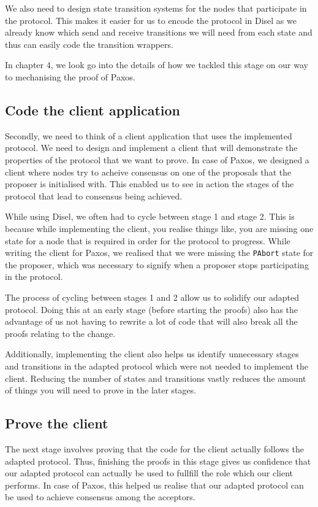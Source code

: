 We also need to design state transition systems for the nodes that participate
in the protocol. This makes it easier for us to encode the protocol in Disel as
we already know which send and receive transitions we will need from each state
and thus can easily code the transition wrappers.

In chapter 4, we look go into the details of how we tackled this stage on our way
to mechanising the proof of Paxos.

\subsection{Code the client application}
Secondly, we need to think of a client application that uses the implemented protocol.
We need to design and implement a client that will demonstrate the properties of the
protocol that we want to prove. In case of Paxos, we designed a client
where nodes try to acheive consensus on one of the proposals that the proposer
is initialised with. This enabled us to see in action the stages of the protocol
that lead to consensus being achieved.

While using Disel, we often had to cycle between stage 1 and stage 2.
This is because while implementing the client, you realise things like, you are
missing one state for a node that is required in order for the protocol to progress.
While writing the client for Paxos, we realised that we were missing the \texttt{PAbort}
state for the proposer, which was necessary to signify when a proposer stops
participating in the protocol.

The process of cycling between stages 1 and 2 allow us to solidify our adapted
protocol. Doing this at an early stage (before starting the proofs)
also has the advantage of us not having to rewrite a lot of code that will also
break all the proofs relating to the change.

Additionally, implementing the client also helps us identify unnecessary stages
and transitions in the adapted protocol which were not needed to implement the
client. Reducing the number of states and transitions vastly reduces the amount
of things you will need to prove in the later stages.

\subsection{Prove the client}
The next stage involves proving that the code for the client actually follows
the adapted protocol. Thus, finishing the proofs in this stage gives us
confidence that our adapted protocol can actually be used to fullfill the role
which our client performs. In case of Paxos, this helped us realise that our
adapted protocol can be used to achieve consensus among the acceptors.

